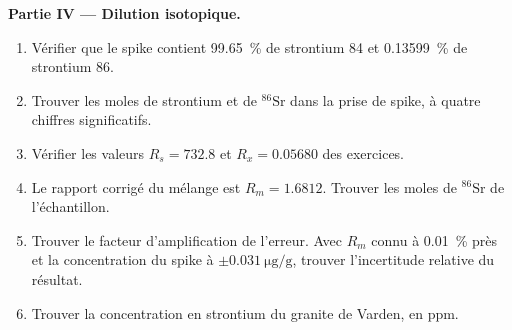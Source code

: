 \begin{problem}
\noindent\textbf{Partie IV --- Dilution isotopique.}
\begin{enumerate}[resume]
  \item Vérifier que le spike contient \qty{99.65}{\percent} de strontium 84 et \qty{0.13599}{\percent}
        de strontium 86.
  \item Trouver les moles de strontium et de $^{86}\mathrm{Sr}$ dans la prise de spike, à quatre
        chiffres significatifs.
  \item Vérifier les valeurs $R_s = 732.8$ et $R_x = 0.05680$ des exercices.
  \item Le rapport corrigé du mélange est $R_m = 1.6812$. Trouver les moles de $^{86}\mathrm{Sr}$
        de l'échantillon.
  \item Trouver le facteur d'amplification de l'erreur. Avec $R_m$ connu à \qty{0.01}{\percent} près et la concentration
        du spike à $\pm\qty{0.031}{\micro\gram\per\gram}$, trouver l'incertitude relative du
        résultat.
  \item Trouver la concentration en strontium du granite de Varden, en ppm.
\end{enumerate}
\end{problem}
